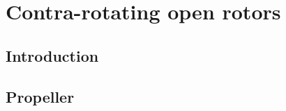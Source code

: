 \chapter{Contra-rotating open rotors}
\label{cha:cror}

\chabstract{}

\minitoc
\newpage

\section{Introduction}
\label{sec:cror_intro}


\section{Propeller}
\label{sec:cror_propeller}


\chconclu{}
